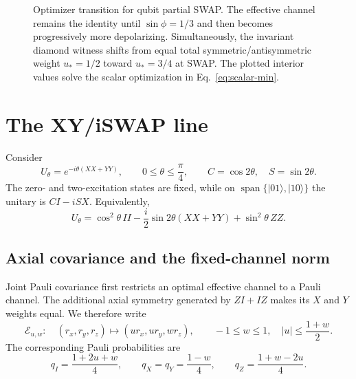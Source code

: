\documentclass[11pt,a4paper]{article}
\theoremstyle{remark}
\newcommand{\cE}{\mathcal{E}}
\begin{document}
\begin{figure}[t]
\centering
{}
\caption{Optimizer transition for qubit partial SWAP.  The effective channel
remains the identity until $\sin\phi=1/3$ and then becomes progressively more
depolarizing.  Simultaneously, the invariant diamond witness shifts from equal
total symmetric/antisymmetric weight $u_*=1/2$ toward $u_*=3/4$ at SWAP.
The plotted interior values solve the scalar optimization in
Eq.~\eqref{eq:scalar-min}.}
\label{fig:partial-swap-phase}
\end{figure}

\section{The XY/iSWAP line}

Consider
\begin{equation}
 U_\theta=e^{-i\theta(XX+YY)},\qquad 0\leq\theta\leq\frac{\pi}{4},
 \qquad C=\cos2\theta,\quad S=\sin2\theta.
 \label{eq:xy-unitary}
\end{equation}
The zero- and two-excitation states are fixed, while on
$\operatorname{span}\{|01\rangle,|10\rangle\}$ the unitary is
$C I-iS X$.  Equivalently,
\[
 U_\theta=\cos^2\theta\,II-\frac{i}{2}\sin2\theta(XX+YY)
           +\sin^2\theta\,ZZ.
\]

\subsection{Axial covariance and the fixed-channel norm}

Joint Pauli covariance first restricts an optimal effective channel to a Pauli
channel.  The additional axial symmetry generated by $ZI+IZ$ makes its $X$
and $Y$ weights equal.  We therefore write
\begin{equation}
 \cE_{u,w}:\quad (r_x,r_y,r_z)\longmapsto(ur_x,ur_y,wr_z),
 \qquad -1\leq w\leq1,\quad |u|\leq\frac{1+w}{2}.
 \label{eq:xy-channel}
\end{equation}
The corresponding Pauli probabilities are
\[
 q_I=\frac{1+2u+w}{4},\qquad q_X=q_Y=\frac{1-w}{4},\qquad
 q_Z=\frac{1+w-2u}{4}.
\]
\end{document}
